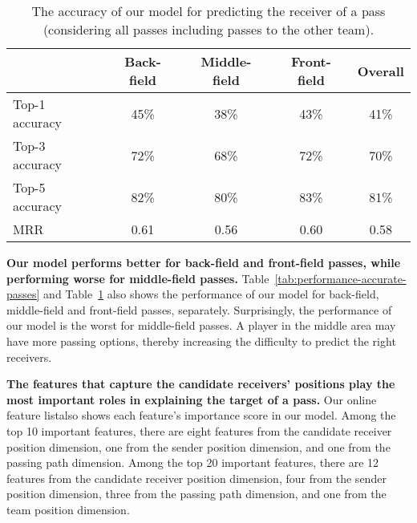 \begin{table}[!t]
\caption{The accuracy of our model for predicting the receiver of a pass (considering all passes including passes to the other team).}
\centering
\begin{tabular}{lcccc}
  \hline
  & Back-field & Middle-field & Front-field & Overall \\
  \hline
  Top-1 accuracy & 45\% & 38\% & 43\% & 41\% \\
  Top-3 accuracy & 72\% & 68\% & 72\% & 70\% \\
  Top-5 accuracy & 82\% & 80\% & 83\% & 81\% \\
  MRR & 0.61 & 0.56 & 0.60 & 0.58 \\
  \hline
\end{tabular}
\label{tab:performance-all-passes}
\vspace{-0.3cm}
\end{table}

\textbf{Our model performs better for back-field and front-field passes, while performing worse for middle-field passes.}
Table~\ref{tab:performance-accurate-passes} and Table~\ref{tab:performance-all-passes} also shows the performance of our model for back-field, middle-field and front-field passes, separately.
Surprisingly, the performance of our model is the worst for middle-field passes. A player in the middle area may have more passing options, thereby increasing the difficulty to predict the right receivers.

\textbf{The features that capture the candidate receivers' positions play the most important roles in explaining the target of a pass.}
Our online feature list\footnotemark[\ref{feature-list}] also shows each feature's importance score in our model.
Among the top 10 important features, there are eight features from the candidate receiver position dimension, one from the sender position dimension, and one from the passing path dimension.
Among the top 20 important features, there are 12 features from the candidate receiver position dimension, four from the sender position dimension, three from the passing path dimension, and one from the team position dimension.

